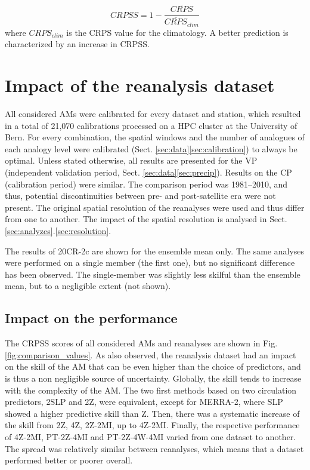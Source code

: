 \documentclass{ametsoc}
\begin{document}
\begin{equation}
\label{eq:CRPSS}
CRPSS = 1-\frac{\overline{CRPS}}{\overline{CRPS}_{clim}}
\end{equation}
where $CRPS_{clim}$ is the CRPS value for the climatology. A better prediction is characterized by an increase in CRPSS.


\section{Impact of the reanalysis dataset}
\label{sec:influence}

All considered AMs were calibrated for every dataset and station, which resulted in a total of 21,070 calibrations processed on a HPC cluster at the University of Bern. For every combination, the spatial windows and the number of analogues of each analogy level were calibrated (Sect. \ref{sec:data}\ref{sec:calibration}) to always be optimal. Unless stated otherwise, all results are presented for the VP (independent validation period, Sect. \ref{sec:data}\ref{sec:precip}). Results on the CP (calibration period) were similar. The comparison period was 1981--2010, and thus, potential discontinuities between pre- and post-satellite era were not present. The original spatial resolution of the reanalyses were used and thus differ from one to another. The impact of the spatial resolution is analysed in Sect. \ref{sec:analyzes}.\ref{sec:resolution}.

The results of 20CR-2c are shown for the ensemble mean only. The same analyses were performed on a single member (the first one), but no significant difference has been observed. The single-member was slightly less skilful than the ensemble mean, but to a negligible extent (not shown).


\subsection{Impact on the performance}

The CRPSS scores of all considered AMs and reanalyses are shown in Fig. \ref{fig:comparison_values}. As \citet{Dayon2015} also observed, the reanalysis dataset had an impact on the skill of the AM that can be even higher than the choice of predictors, and is thus a non negligible source of uncertainty. Globally, the skill tends to increase with the complexity of the AM. The two first methods based on two circulation predictors, 2SLP and 2Z, were equivalent, except for MERRA-2, where SLP showed a higher predictive skill than Z. Then, there was a systematic increase of the skill from 2Z, 4Z, 2Z-2MI, up to 4Z-2MI. Finally, the respective performance of 4Z-2MI, PT-2Z-4MI and PT-2Z-4W-4MI varied from one dataset to another. The spread was relatively similar between reanalyses, which means that a dataset performed better or poorer overall.
\end{document}
